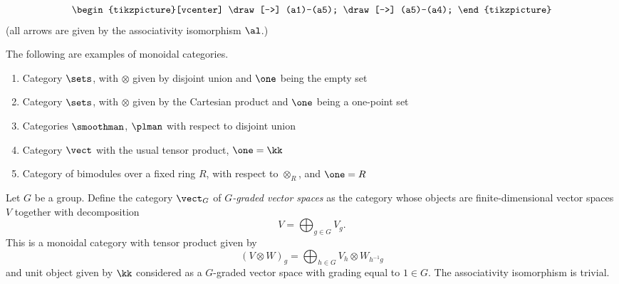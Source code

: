 \begin{definition}
\begin{enumerate}
\begin{equation}
\begin{tikzpicture}[vcenter]
          \draw[->] (a1)--(a5);
          \draw[->] (a5)--(a4);
        \end{tikzpicture}
      \end{equation}
      (all arrows are given by the associativity isomorphism $\al$.)

  \end{enumerate}
\end{definition}

\begin{example}
The following are examples of monoidal categories.
  \begin{enumerate}
    \item Category $\sets$, with $\otimes$ given by disjoint union and
      $\one$ being the empty set
    \item Category $\sets$, with $\otimes$ given by the Cartesian product
      and $\one$ being a one-point set
    \item Categories $\smoothman$, $\plman$ with respect to disjoint union
    \item Category $\vect$ with the usual tensor product, $\one = \kk$
    \item Category of bimodules over a fixed ring $R$, with respect
      to $\otimes_R$, and $\one = R$

  \end{enumerate}
\end{example}


\begin{example}\label{x:vecg}
  Let $G$ be a group. Define the category $\vect_G$ of \emph{$G$-graded vector
  spaces} as the category
  whose objects are finite-dimensional vector spaces $V$ together with
  decomposition
  $$
    V=\bigoplus_{g\in G} V_g.
  $$
  This is a monoidal category with tensor product given by
  $$
    (V\otimes W)_g = \bigoplus_{h\in G} V_h \otimes W_{h^{-1}g}
  $$
  and unit object given by $\kk$ considered as a $G$-graded vector space with
  grading equal to $1\in G$. The associativity isomorphism is trivial.
\end{example}



